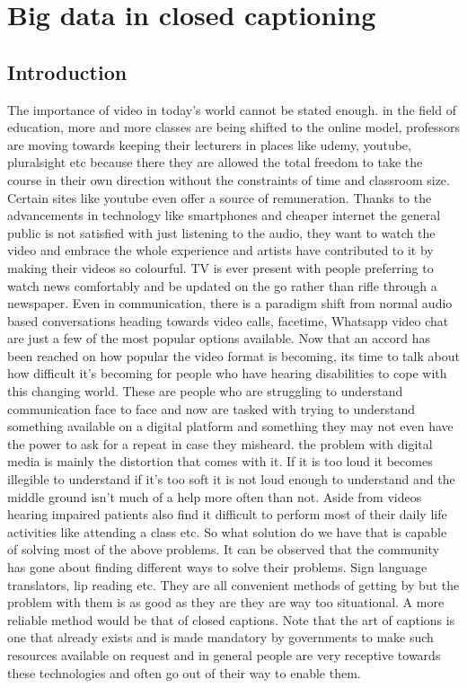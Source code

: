 \documentclass[sigconf]{acmart}
\begin{document}
\section{Big data in closed captioning}

\subsection{Introduction}

The importance of video in today's world cannot be stated enough. in the field of education, more and more classes are being shifted to the online model, professors are moving towards keeping their lecturers in places like udemy, youtube, pluralsight etc because there they are allowed the total freedom to take the course in their own direction without the constraints of time and classroom size. Certain sites like youtube even offer a source of remuneration. Thanks to the advancements in technology like smartphones and cheaper internet the general public is not satisfied with just listening to the audio, they want to watch the video and embrace the whole experience and artists have contributed to it by making their videos so colourful. TV is ever present with people preferring to watch news comfortably and be updated on the go rather than rifle through a newspaper. Even in communication, there is a paradigm shift from normal audio based conversations heading towards video calls, facetime, Whatsapp video chat are just a few of the most popular options available.
\newline
Now that an accord has been reached on how popular the video format is becoming, its time to talk about how difficult it's becoming for people who have hearing disabilities to cope with this changing world. These are people who are struggling to understand communication face to face and now are tasked with trying to understand something available on a digital platform and something they may not even have the power to ask for a repeat in case they misheard. the problem with digital media is mainly the distortion that comes with it. If it is too loud it becomes illegible to understand if it's too soft it is not loud enough to understand and the middle ground isn't much of a help more often than not. Aside from videos hearing impaired patients also find it difficult to perform most of their daily life activities like attending a class etc.
\newline
So what solution do we have that is capable of solving most of the above problems. It can be observed that the community has gone about finding different ways to solve their problems. Sign language translators, lip reading etc. They are all convenient methods of getting by but the problem with them is as good as they are they are way too situational. A more reliable method would be that of closed captions. Note that the art of captions is one that already exists and is made mandatory by governments to make such resources available on request and in general people are very receptive towards these technologies and often go out of their way to enable them.
\end{document}
